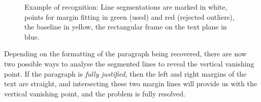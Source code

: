 \begin{figure}[t]
\centering
\begin{center}
\hspace{2mm}
\end{center}
\vspace*{0mm}
\caption{Example of recognition: 
Line segmentations are marked in white, points for margin fitting in green
(used) and red (rejected outliers), the baseline in yellow,
the rectangular frame on the text plane in blue.}
\label{linesegfig}
\label{summaryfig}
\end{figure}



Depending on the formatting of the paragraph being recovered, there are now two
possible ways to analyse the segmented lines to reveal the vertical vanishing
point.  If the paragraph is {\em fully justified}, then the left and right
margins of the text are straight, and intersecting these two margin lines will
provide us with the vertical vanishing point, and the problem is fully resolved.

